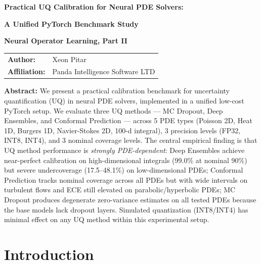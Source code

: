 \documentclass[12pt,a4paper]{article}
\theoremstyle{plain}
\begin{document}
\begin{titlepage}
    \centering
    \vspace*{2cm}

    {\LARGE\bfseries Practical UQ Calibration for Neural PDE Solvers:\par}
    {\LARGE\bfseries A Unified PyTorch Benchmark Study\par}
    \vspace{1.5cm}

    {\Large\bfseries Neural Operator Learning, Part II\par}
    \vspace{2cm}

    \begin{tabular}{ll}
        \textbf{Author:} & Xeon Pitar \\
        \textbf{Affiliation:} & Panda Intelligence Software LTD
    \end{tabular}
    \vspace{2cm}

    \parbox{0.9\textwidth}{\small
        \textbf{Abstract:} We present a practical calibration benchmark for uncertainty
        quantification (UQ) in neural PDE solvers, implemented in a unified low-cost
        PyTorch setup.
        We evaluate three UQ methods --- MC Dropout, Deep Ensembles, and Conformal
        Prediction --- across 5 PDE types (Poisson 2D, Heat 1D, Burgers 1D,
        Navier-Stokes 2D, 100-d integral), 3 precision levels (FP32, INT8, INT4),
        and 3 nominal coverage levels.
        The central empirical finding is that UQ method performance is
        \emph{strongly PDE-dependent}: Deep Ensembles achieve near-perfect
        calibration on high-dimensional integrals (99.0\% at nominal 90\%)
        but severe undercoverage (17.5--48.1\%) on low-dimensional PDEs;
        Conformal Prediction tracks nominal coverage across all PDEs but with
        wide intervals on turbulent flows and ECE still elevated on parabolic/hyperbolic
        PDEs; MC Dropout produces degenerate zero-variance estimates on all
        tested PDEs because the base models lack dropout layers.
        Simulated quantization (INT8/INT4) has minimal effect on any UQ method
        within this experimental setup.
    }
\end{titlepage}

\clearpage
{}
\tableofcontents
\clearpage
{}

\section{Introduction}
\label{sec:intro}
\end{document}
